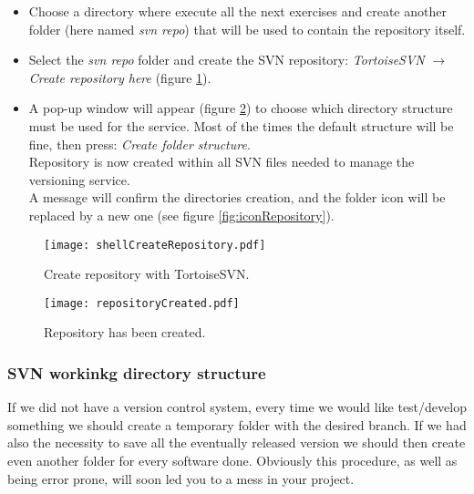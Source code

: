 \begin{itemize}
    \item Choose a directory where execute all the next exercises and create another folder (here named \textit{svn repo}) that will be used to contain the repository itself.
    
    \item Select the \textit{svn repo} folder and create the SVN repository: \textit{TortoiseSVN} $\rightarrow$ \textit{Create repository here} (figure \ref{fig:shellCreateRepository}).
    
    \item A pop-up window will appear (figure \ref{fig:repositoryCreated}) to choose which directory structure must be used for the service. Most of the times the default structure will be fine, then press: \textit{Create folder structure}.\\
    Repository is now created within all SVN files needed to manage the versioning service.\\
    A message will confirm the directories creation, and the folder icon will be replaced by a new one (see figure \ref{fig:iconRepository}).
    

\end{itemize}

\begin{figure}[htbp]
    \centering
    \texttt{[image: shellCreateRepository.pdf]}
    \caption{Create repository with TortoiseSVN.}
    \label{fig:shellCreateRepository}
\end{figure}

\begin{figure}[htbp]
    \centering
    \texttt{[image: repositoryCreated.pdf]}
    \caption{Repository has been created.}
    \label{fig:repositoryCreated}
\end{figure}





\subsubsection{SVN workinkg directory structure}
\label{subsubsection:SVNWorkinkgDirectoryStructure}

If we did not have a version control system, every time we would like test/develop something we should create a temporary folder with the desired branch.
If we had also the necessity to save all the eventually released version we should then create even another folder for every software done. Obviously this procedure, as well as being error prone, will soon led you to a mess in your project.\\

